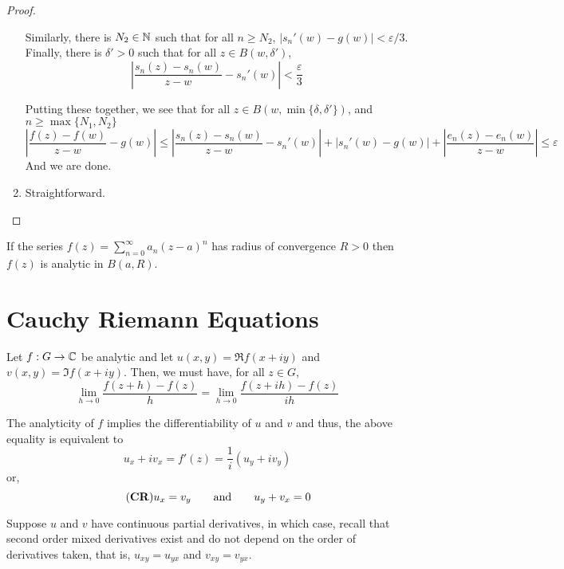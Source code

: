 \begin{proof}
\begin{enumerate}[label = (\alph*)]
    Similarly, there is $N_2\in\mathbb{N}$ such that for all $n\ge N_2$, $|s_n'(w) - g(w)| < \varepsilon/3$. Finally, there is $\delta' > 0$ such that for all $z\in B(w,\delta')$, 
    \begin{equation*}
        \left|\frac{s_n(z) - s_n(w)}{z - w} - s_n'(w)\right| < \frac{\varepsilon}{3}
    \end{equation*}

    Putting these together, we see that for all $z\in B(w,\min\{\delta,\delta'\})$, and $n\ge\max\{N_1,N_2\}$
    \begin{equation*}
        \left|\frac{f(z) - f(w)}{z - w} - g(w)\right|\le\left|\frac{s_n(z) - s_n(w)}{z - w} - s_n'(w)\right| + |s_n'(w) - g(w)| + \left|\frac{e_n(z) - e_n(w)}{z - w}\right|\le\varepsilon
    \end{equation*}
    And we are done.

    \item Straightforward.
\end{enumerate}
\end{proof}

\begin{corollary}
    If the series $f(z) = \sum\limits_{n = 0}^\infty a_n(z - a)^n$ has radius of convergence $R > 0$ then $f(z)$ is analytic in $B(a, R)$.
\end{corollary}

\section{Cauchy Riemann Equations}

Let $f: G\to\mathbb{C}$ be analytic and let $u(x,y) = \Re f(x + iy)$ and $v(x,y) = \Im f(x + iy)$. Then, we must have, for all $z\in G$, 
\begin{equation*}
    \lim_{h\to 0}\frac{f(z + h) - f(z)}{h} = \lim_{h\to 0}\frac{f(z + ih) - f(z)}{ih}
\end{equation*}

The analyticity of $f$ implies the differentiability of $u$ and $v$ and thus, the above equality is equivalent to
\begin{equation*}
    u_x + i v_x = f'(z) = \frac{1}{i}\left(u_y + iv_y\right)
\end{equation*}
or,
\begin{equation*}\tag{\textbf{CR}}\label{eq:cauchy-riemann}
    u_x = v_y \qquad\text{and}\qquad u_y + v_x = 0
\end{equation*}

Suppose $u$ and $v$ have continuous partial derivatives, in which case, recall that second order mixed derivatives exist and do not depend on the order of derivatives taken, that is, $u_{xy} = u_{yx}$ and $v_{xy} = v_{yx}$. 

